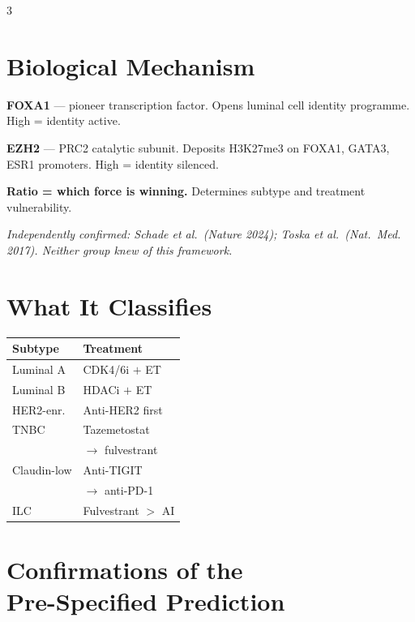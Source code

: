 \documentclass[9pt, a4paper]{article}
\begin{document}
\begin{multicols}{3}

\section{Biological Mechanism}

{\small
\textbf{FOXA1} --- pioneer transcription factor.
Opens luminal cell identity programme.
High = identity active.

\smallskip
\textbf{EZH2} --- PRC2 catalytic subunit.
Deposits H3K27me3 on FOXA1, GATA3, ESR1
promoters. High = identity silenced.

\smallskip
\textbf{Ratio = which force is winning.}
Determines subtype and treatment vulnerability.

\smallskip
\textit{Independently confirmed: Schade et al.\
(\textit{Nature} 2024); Toska et al.\
(\textit{Nat.\ Med.} 2017). Neither group
knew of this framework.}}

\section{What It Classifies}

{\small
\begin{tabular}{@{}p{1.55cm}p{2.3cm}@{}}
\toprule
\textbf{Subtype} & \textbf{Treatment} \\
\midrule
Luminal A    & CDK4/6i $+$ ET \\[0.15em]
Luminal B    & HDACi $+$ ET \\[0.15em]
HER2-enr.    & Anti-HER2 first \\[0.15em]
TNBC         & Tazemetostat\\
             & $\rightarrow$ fulvestrant \\[0.15em]
Claudin-low  & Anti-TIGIT\\
             & $\rightarrow$ anti-PD-1 \\[0.15em]
ILC          & Fulvestrant $>$ AI \\
\bottomrule
\end{tabular}}

\columnbreak

\section{Confirmations of the\\Pre-Specified Prediction}


\end{multicols}
\end{document}
